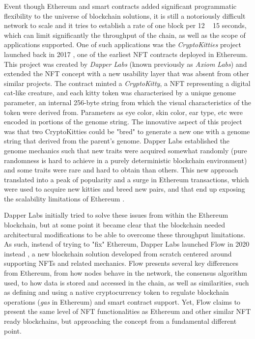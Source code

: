 \documentclass[../NFTComp_IEEE.tex]{subfiles}
\begin{document}
\par
Event though Ethereum and smart contracts added significant programmatic flexibility to the universe of blockchain solutions, it is still a notoriously difficult network to scale and it tries to establish a rate of one block per 12 ~ 15 seconds, which can limit significantly the throughput of the chain, as well as the scope of applications supported. One of such applications was the \textit{CryptoKitties} project launched back in 2017 \cite{Dapper2017}, one of the earliest NFT contracts deployed in Ethereum. This project was created by \textit{Dapper Labs} (known previously as \textit{Axiom Labs}) and extended the NFT concept with a new usability layer that was absent from other similar projects. The contract minted a \textit{CryptoKitty}, a NFT representing a digital cat-like creature, and each kitty token was characterised by a unique genome parameter, an internal 256-byte string from which the visual characteristics of the token were derived from. Parameters as eye color, skin color, ear type, etc were encoded in portions of the genome string. The innovative aspect of this project was that two CryptoKitties could be "bred" to generate a new one with a genome string that derived from the parent's genome. Dapper Labs established the genome mechanics such that new traits were acquired somewhat randomly (pure randomness is hard to achieve in a purely deterministic blockchain environment) and some traits were rare and hard to obtain than others. This new approach translated into a peak of popularity and a surge in Ethereum transactions, which were used to acquire new kitties and breed new pairs, and that end up exposing the scalability limitations of Ethereum \cite{bbc2017}.
\par
Dapper Labs initially tried to solve these issues from within the Ethereum blockchain, but at some point it became clear that the blockchain needed architectural modifications to be able to overcome these throughput limitations. As such, instead of trying to "fix" Ethereum, Dapper Labs launched Flow in 2020 instead \cite{Gharegozlou2019}, a new blockchain solution developed from scratch centered around supporting NFTs and related mechanics. Flow presents several key differences from Ethereum, from how nodes behave in the network, the consensus algorithm used, to how data is stored and accessed in the chain, as well as similarities, such as defining and using a native cryptocurrency token to regulate blockchain operations (\textit{gas} in Ethereum) and smart contract support. Yet, Flow claims to present the same level of NFT functionalities as Ethereum and other similar NFT ready blockchains, but approaching the concept from a fundamental different point.
\end{document}
